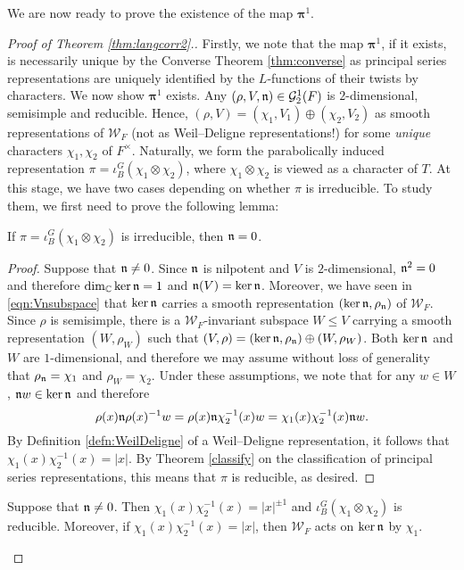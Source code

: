We are now ready to prove the existence of the map $\bm\pi^1$.
\begin{proof}[Proof of Theorem \ref{thm:langcorr2}.]
    Firstly, we note that the map $\bm\pi^{1}$, if it exists, is necessarily unique by the Converse Theorem \ref{thm:converse} as principal series representations are uniquely identified by the $L$-functions of their twists by characters. We now show $\bm\pi^1$ exists. Any $(\rho,V,\mathfrak{n})\in\mathcal{G}_2^1(F)$ is $2$-dimensional, semisimple and reducible. Hence, $(\rho,V)=(\chi_1,V_1)\oplus(\chi_2,V_2)$ as smooth representations of $\mathcal{W}_F$ (not as Weil--Deligne representations!) for some \textit{unique} characters $\chi_1,\chi_2$ of $F^\times$. Naturally, we form the parabolically induced representation $\pi=\iota_B^G(\chi_1\otimes\chi_2)$, where $\chi_1\otimes\chi_2$ is viewed as a character of $T$. At this stage, we have two cases depending on whether $\pi$ is irreducible. To study them, we first need to prove the following lemma:
    \begin{lemma}
        If $\pi=\iota_B^G(\chi_1\otimes\chi_2)$ is irreducible, then $\mathfrak{n}=0$.
    \end{lemma}
    \begin{proof}
        Suppose that $\mathfrak{n}\neq 0$. Since $\mathfrak{n}$ is nilpotent and $V$ is $2$-dimensional, $\mathfrak{n}^2=0$ and therefore $\dim_{\mathbb{C}}\ker\mathfrak{n}=1$ and $\mathfrak{n}(V)=\ker\mathfrak{n}$. Moreover, we have seen in \eqref{eqn:Vnsubspace} that $\ker\mathfrak{n}$ carries a smooth representation $(\ker\mathfrak{n},\rho_{\mathfrak{n}})$ of $\mathcal{W}_F$. Since $\rho$ is semisimple, there is a $\mathcal{W}_F$-invariant subspace $W\leq V$ carrying a smooth representation $(W,\rho_W)$ such that $(V,\rho)=(\ker\mathfrak{n},\rho_{\mathfrak{n}})\oplus(W,\rho_W)$. Both $\ker\mathfrak{n}$ and $W$ are $1$-dimensional, and therefore we may assume without loss of generality that $\rho_{\mathfrak{n}}=\chi_1$ and $\rho_W=\chi_2$. Under these assumptions, we note that for any $w\in W$, $\mathfrak{n} w\in\ker\mathfrak{n}$ and therefore
        $$\rho(x)\mathfrak{n}\rho(x)^{-1}w=\rho(x)\mathfrak{n}\chi^{-1}_2(x)w=\chi_1(x)\chi_2^{-1}(x)\mathfrak{n} w.$$
        By Definition \ref{defn:WeilDeligne} of a Weil--Deligne representation, it follows that $\chi_1(x)\chi_2^{-1}(x)=|x|$. By Theorem \ref{classify} on the classification of principal series representations, this means that $\pi$ is reducible, as desired.
    \end{proof}
    \fi
    \begin{lemma}
        Suppose that $\mathfrak{n}\neq0$. Then $\chi_1(x)\chi_2^{-1}(x)=|x|^{\pm1}$ and $\iota_B^G(\chi_1\otimes\chi_2)$ is reducible. Moreover, if $\chi_1(x)\chi_2^{-1}(x)=|x|$, then $\mathcal{W}_F$ acts on $\ker\mathfrak{n}$ by $\chi_1$.

\end{lemma}
\end{proof}
